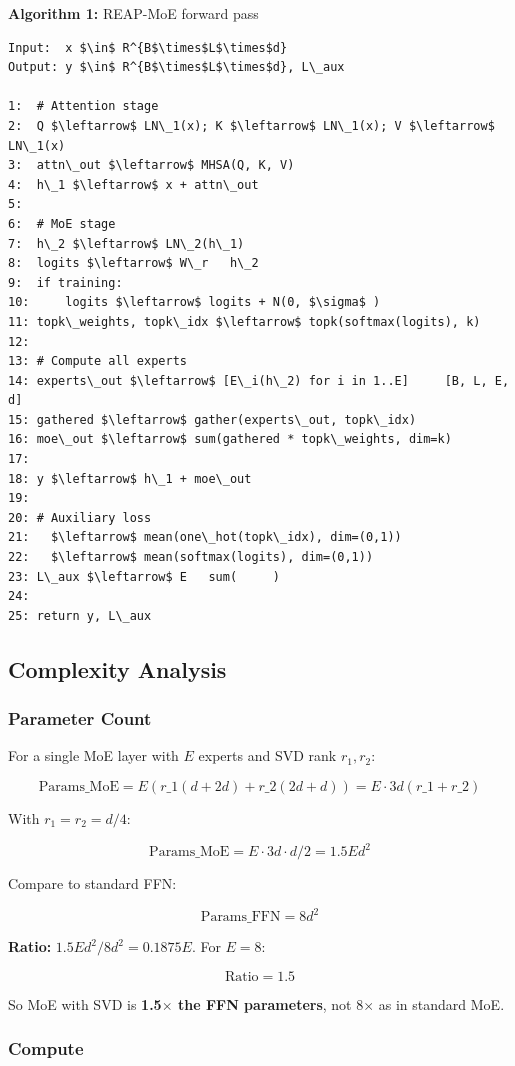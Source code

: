 \textbf{Algorithm 1:} REAP-MoE forward pass
\begin{lstlisting}
Input:  x $\in$ R^{B$\times$L$\times$d}
Output: y $\in$ R^{B$\times$L$\times$d}, L\_aux

1:  # Attention stage
2:  Q $\leftarrow$ LN\_1(x); K $\leftarrow$ LN\_1(x); V $\leftarrow$ LN\_1(x)
3:  attn\_out $\leftarrow$ MHSA(Q, K, V)
4:  h\_1 $\leftarrow$ x + attn\_out
5:
6:  # MoE stage
7:  h\_2 $\leftarrow$ LN\_2(h\_1)
8:  logits $\leftarrow$ W\_r   h\_2
9:  if training:
10:     logits $\leftarrow$ logits + N(0, $\sigma$ )
11: topk\_weights, topk\_idx $\leftarrow$ topk(softmax(logits), k)
12:
13: # Compute all experts
14: experts\_out $\leftarrow$ [E\_i(h\_2) for i in 1..E]     [B, L, E, d]
15: gathered $\leftarrow$ gather(experts\_out, topk\_idx)
16: moe\_out $\leftarrow$ sum(gathered * topk\_weights, dim=k)
17:
18: y $\leftarrow$ h\_1 + moe\_out
19:
20: # Auxiliary loss
21:   $\leftarrow$ mean(one\_hot(topk\_idx), dim=(0,1))
22:   $\leftarrow$ mean(softmax(logits), dim=(0,1))
23: L\_aux $\leftarrow$ E   sum(     )
24:
25: return y, L\_aux
\end{lstlisting}

\subsection{Complexity Analysis}

\subsubsection{Parameter Count}

For a single MoE layer with $E$ experts and SVD rank $r_1, r_2$:

\[
\text{Params}\_\text{MoE} = E \left( r\_1(d + 2d) + r\_2(2d + d) \right) = E \cdot 3d(r\_1 + r\_2)
\tag{4.14}
\]

With $r_1 = r_2 = d/4$:

\[
\text{Params}\_\text{MoE} = E \cdot 3d \cdot d/2 = 1.5 E d^2
\tag{4.15}
\]

Compare to standard FFN:

\[
\text{Params}\_\text{FFN} = 8 d^2
\tag{4.16}
\]

\textbf{Ratio:} $1.5 E d^2 / 8 d^2 = 0.1875 E$. For $E = 8$:

\[
\text{Ratio} = 1.5
\tag{4.17}
\]

So MoE with SVD is \textbf{1.5$\times$ the FFN parameters}, not 8$\times$ as in standard MoE.

\subsubsection{Compute}

